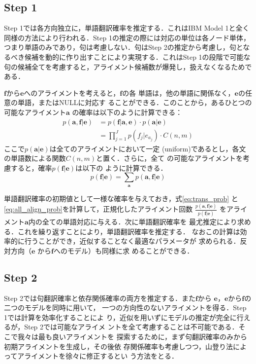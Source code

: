 \documentclass[japanese]{jnlp_1.4}
\begin{document}
\subsection{Step 1}

Step 1では各方向独立に，単語翻訳確率を推定する．これはIBM Model 1と全く
同様の方法により行われる．Step 1の推定の際には対応の単位は各ノード単体，
つまり単語のみであり，句は考慮しない．句はStep 2の推定から考慮し，句とな
るべき候補を動的に作り出すことにより実現する．これはStep 1の段階で可能な
句の候補全てを考慮すると，アライメント候補数が爆発し，扱えなくなるためで
ある．


$\mathbf{f}$から$\mathbf{e}$へのアライメントを考えると，$\mathbf{f}$の各
単語は，他の単語に関係なく，$\mathbf{e}$の任意の単語，またはNULLに対応す
ることができる．このことから，あるひとつの可能なアライメント$\mathbf{a}$
の確率は以下のように計算できる：
\begin{align}
 \label{eq:trans_prob}
p(\mathbf{a}, \mathbf{f}|\mathbf{e}) & = p(\mathbf{f}|\mathbf{a}, \mathbf{e}) \cdot p(\mathbf{a}|\mathbf{e}) \\
 & = \prod_{j=1}^{J} p(f_j|e_{a_j}) \cdot C(n, m)
\end{align}
ここで$p(\mathbf{a}|\mathbf{e})$は全てのアライメントにおいて一定
(uniform)であるとし，各文の単語数による関数$C(n, m)$と置く．さらに，全て
の可能なアライメントを考慮すると，確率$p(\mathbf{f}|\mathbf{e})$は以下の
ように計算できる．
\begin{equation}
 \label{eq:all_align_prob}
 p(\mathbf{f}|\mathbf{e}) = \sum_{\mathbf{a}} p(\mathbf{a}, \mathbf{f}|\mathbf{e})
\end{equation}

単語翻訳確率の初期値として一様な確率を与えておき，式\ref{eq:trans_prob} 
と\ref{eq:all_align_prob}を計算して，正規化したアライメント回数
$\frac{p(\mathbf{a}, \mathbf{f}|\mathbf{e})}{p(\mathbf{f}|\mathbf{e})}$ 
をアライメント$\mathbf{a}$内の全ての単語対応に与える．次に単語翻訳確率を
最尤推定により求める．これを繰り返すことにより，単語翻訳確率を推定する．
なおこの計算は効率的に行うことができ，近似することなく最適なパラメータが
求められる．反対方向（$\mathbf{e}$ から$\mathbf{f}$へのモデル）も同様に求
めることができる．



\subsection{Step 2}

Step 2では句翻訳確率と依存関係確率の両方を推定する．また$\mathbf{f}$から
$\mathbf{e}$，$\mathbf{e}$から$\mathbf{f}$の二つのモデルを同時に用いて，
一つの方向性のないアライメントを得る．Step 1では計算を効率化することによ
り，近似を用いずにモデルの推定が完全に行えるが，Step 2では可能なアライメ
ントを全て考慮することは不可能である．そこで我々は最も良いアライメントを
探索するために，まず句翻訳確率のみから初期アライメントを生成し，その後依
存関係確率も考慮しつつ，山登り法によってアライメントを徐々に修正するとい
う方法をとる．
\end{document}
